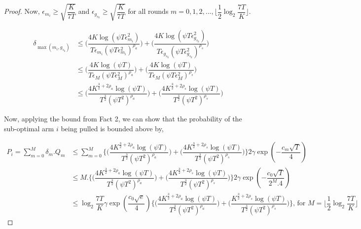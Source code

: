 \begin{proof}
Now, $\epsilon_{m_{i}}\geq \sqrt{\dfrac{K}{7T}}$ and $\epsilon_{g_{s_{k}}}\geq \sqrt{\dfrac{K}{7T}}$ for all rounds $m=0,1,2,...,\big \lfloor \dfrac{1}{2}\log_{2} \dfrac{7T}{K}\big\rfloor$.

\begin{align*}
\delta_{\max(m_{i},g_{s_{k}})} &\leq \bigg(\dfrac{4K\log (\psi T \epsilon_{m_{i}}^{2})}{T\epsilon_{m_{i}}(\psi T\epsilon_{m_{i}}^{2})^{\rho_{a}}}\bigg) + \bigg(\dfrac{4K\log (\psi T \epsilon_{g_{s_{k}}}^{2})}{T\epsilon_{g_{s_{k}}}(\psi  T\epsilon_{g_{s_{k}}}^{2})^{\rho_{s}}}\bigg)\\
& \leq \bigg(\dfrac{4K\log (\psi T )}{T\epsilon_{M}(\psi T\epsilon_{M}^{2})^{\rho_{a}}}\bigg) + \bigg(\dfrac{4K\log (\psi T )}{T\epsilon_{M}(\psi  T\epsilon_{M}^{2})^{\rho_{s}}}\bigg)\\
& \leq \bigg(\dfrac{4K^{\frac{3}{2} +2\rho_a}\log (\psi T )}{T^{\frac{3}{2}}(\psi T^2)^{\rho_{a}}}\bigg) + \bigg(\dfrac{4K^{\frac{3}{2} +2\rho_s}\log (\psi T )}{T^{\frac{3}{2}}(\psi T^2)^{\rho_{s}}}\bigg)
\end{align*}

Now, applying the bound from Fact 2, we can show that the probability of the sub-optimal arm $i$ being pulled is bounded above by,

\begin{align*}
P_{i} = \sum_{m=0}^{M} \delta_{m}.Q_{m} &\leq \sum_{m=0}^{M} \bigg\lbrace\bigg(\dfrac{4K^{\frac{3}{2} +2\rho_a}\log (\psi T )}{T^{\frac{3}{2}}(\psi T^2)^{\rho_{a}}}\bigg) + \bigg(\dfrac{4K^{\frac{3}{2} +2\rho_{s}}\log (\psi T )}{T^{\frac{3}{2}}(\psi T^2)^{\rho_{s}}}\bigg)\bigg\rbrace 2\gamma \exp(-\dfrac{c_{m}\sqrt{T}}{4})\\
& \leq M.\bigg\lbrace\bigg(\dfrac{4K^{\frac{3}{2} +2\rho_a}\log (\psi T )}{T^{\frac{3}{2}}(\psi T^2)^{\rho_{a}}}\bigg) + \bigg(\dfrac{4K^{\frac{3}{2} +2\rho_{s}}\log (\psi T )}{T^{\frac{3}{2}}(\psi T^2)^{\rho_{s}}}\bigg)\bigg\rbrace 2\gamma \exp(-\dfrac{c_{0}\sqrt{T}}{2^{M}.4})\\
& \leq \log_{2}\dfrac{7T}{K}\gamma \exp(\dfrac{c_{0}\sqrt{e}}{4})\bigg\lbrace\bigg(\dfrac{4K^{\frac{3}{2} +2\rho_{a}}\log (\psi T )}{T^{\frac{3}{2}}(\psi T^2)^{\rho_{a}}}\bigg) + \bigg(\dfrac{K^{\frac{3}{2} +2\rho_{s}}\log (\psi T )}{T^{\frac{3}{2}}(\psi T^2)^{\rho_{s}}}\bigg)\bigg\rbrace \text{, for $M=\big \lfloor \dfrac{1}{2}\log_{2} \dfrac{7T}{K}\big\rfloor$}
\end{align*}


\end{proof}
